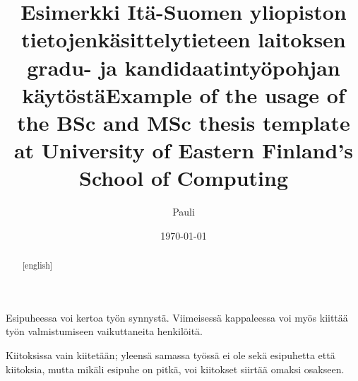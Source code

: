 \documentclass[gradu,finnish,twoside,pdfa]{uefcsthesis}
\title{Esimerkki Itä-Suomen yliopiston tietojenkäsittelytieteen laitoksen gradu- ja kandidaatintyöpohjan käytöstä}
\title[english]{Example of the usage of the BSc and MSc thesis template at University of Eastern Finland's School of Computing}
\author{Pauli}{Miettinen}
\date{\today}
\begin{document}
\maketitle
\begin{abstract}
  
\end{abstract}
\begin{abstract}[english]
  
\end{abstract}

\frontmatter
\begin{preface}
  Esipuheessa voi kertoa työn synnystä. Viimeisessä kappaleessa voi myös kiittää työn valmistumiseen vaikuttaneita henkilöitä.
\end{preface}
\begin{acknowledgements}
  Kiitoksissa vain kiitetään; yleensä samassa työssä ei ole sekä esipuhetta että kiitoksia, mutta mikäli esipuhe on pitkä, voi kiitokset siirtää omaksi osakseen.
\end{acknowledgements}
\tableofcontents

\mainmatter





\backmatter
\begin{appendices}
  
\end{appendices}
\end{document}
